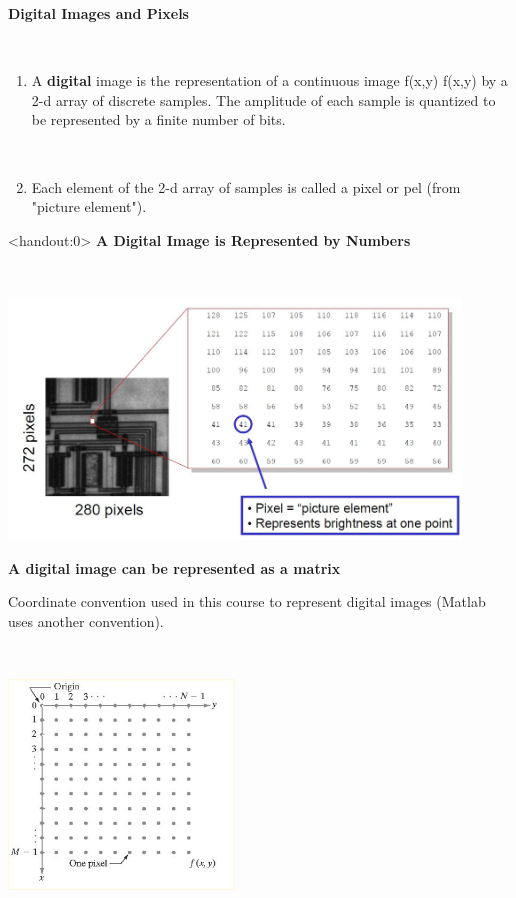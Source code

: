 \documentclass{beamer}
\begin{document}
\begin{frame}%
\textbf{Digital Images and Pixels}	

\

\begin{enumerate}
	\item A \textbf{digital} image is the representation of a continuous image 
	f(x,y)
	f(x,y)
	by a 2-d array of discrete samples. The amplitude of each sample is quantized to be represented by a finite number of bits.
	
	\
	
	
	\item Each element of the 2-d array of samples is called a pixel or pel (from "picture element").
	
	
		
\end{enumerate}
\end{frame}

\begin{frame}<handout:0>
\textbf{	A Digital Image is Represented by Numbers}

\
	
	\begin{center}
		\includegraphics[width=12cm]{./images/pixel_example.jpg} 
	\end{center}
\end{frame}


\begin{frame}%
	\textbf{A digital image can be represented as a matrix}
	
	Coordinate convention used in this course to represent digital images (Matlab uses another convention). 
	
	\
	
	\begin{center}
		\includegraphics[width=6cm]{./images/coordinate_example.jpg} 
	\end{center}
\end{frame}
\end{document}
